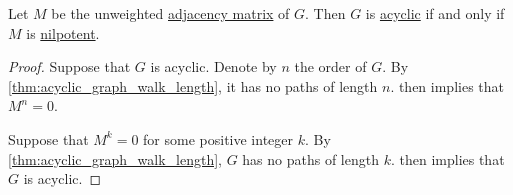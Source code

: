\begin{proposition}\label{thm:nilpotent_adjacency_matrix}
  Let \( M \) be the unweighted \hyperref[def:graph_adjacency_matrix]{adjacency matrix} of \( G \). Then \( G \) is \hyperref[def:acyclic_graph]{acyclic} if and only if \( M \) is \hyperref[def:nilradical]{nilpotent}.
\end{proposition}
\begin{proof}
  \SufficiencySubProof* Suppose that \( G \) is acyclic. Denote by \( n \) the order of \( G \). By \cref{thm:acyclic_graph_walk_length}, it has no paths of length \( n \).  then implies that \( M^n = 0 \).

  \NecessitySubProof* Suppose that \( M^k = 0 \) for some positive integer \( k \). By \cref{thm:acyclic_graph_walk_length}, \( G \) has no paths of length \( k \).  then implies that \( G \) is acyclic.
\end{proof}

